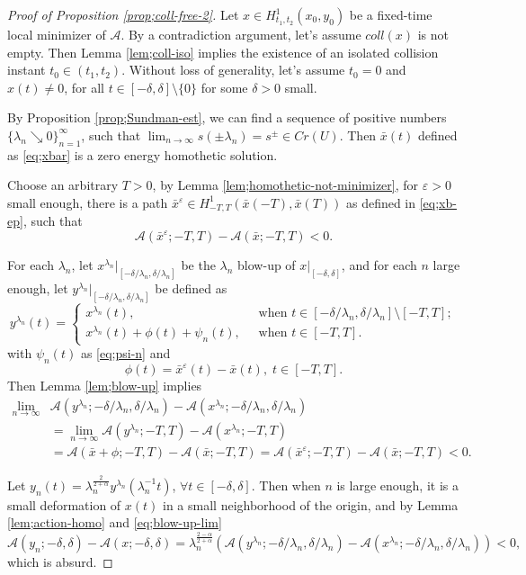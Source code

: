 \documentclass[11pt]{amsart}
\newcommand{\A}{\mathcal A}
\newcommand{\al}{\alpha}
\newcommand{\ep}{\varepsilon}
\newcommand{\dl}{\delta}
\newcommand{\lmd}{\lambda}
\newcommand{\pwa}{\frac{2}{2+\al}}
\newcommand{\xb}{\bar{x}}
\theoremstyle{plain}
\theoremstyle{definition}
\theoremstyle{remark}
\begin{document}
\begin{proof}[Proof of Proposition \ref{prop;coll-free-2}] 
Let $x \in H^1_{t_1, t_2}(x_0, y_0)$ be a fixed-time local minimizer of $\A$. By a contradiction argument, let's assume $coll(x)$ is not empty. Then Lemma \ref{lem;coll-iso} implies the existence of an isolated collision instant $t_0 \in (t_1, t_2)$. Without loss of generality, let's assume $t_0 =0$ and $x(t) \ne 0$, for all $t \in [-\dl, \dl] \setminus \{0\}$ for some $\dl>0$ small. 

By Proposition \ref{prop;Sundman-est}, we can find a sequence of positive numbers $\{\lmd_n \searrow 0\}_{n=1}^{\infty}$, such that  $\lim_{n \to \infty} s(\pm \lmd_{n}) = s^{\pm} \in Cr(U)$. Then $\xb(t)$ defined as \eqref{eq;xbar} is a zero energy homothetic solution. 

Choose an arbitrary $T>0$, by Lemma \ref{lem;homothetic-not-minimizer}, for $\ep>0$ small enough, there is a path $\xb^{\ep} \in H^1_{-T, T}(\xb(-T), \xb(T))$ as defined in \eqref{eq;xb-ep}, such that
\begin{equation*}
 \A(\xb^{\ep}; -T, T) - \A(\xb; -T, T) <0. 
\end{equation*}

For each $\lmd_n$, let $x^{\lmd_n}|_{[-\dl/\lmd_n, \dl/\lmd_n]}$ be the $\lmd_n$ blow-up of $x|_{[-\dl, \dl]}$, and for each $n$ large enough, let $y^{\lmd_n}|_{[-\dl/\lmd_n, \dl/\lmd_n]}$ be defined as
\begin{equation}
\label{eq;y-lmd} y^{\lmd_n}(t) = \begin{cases}
 x^{\lmd_n}(t), \; & \text{ when } t \in [-\dl/\lmd_n, \dl/\lmd_n] \setminus [-T, T]; \\
 x^{\lmd_n}(t) + \phi(t)+ \psi_n(t), \; & \text{ when } t \in [-T, T].
\end{cases}
\end{equation}
with $\psi_n(t)$ as \eqref{eq;psi-n} and 
$$ \phi(t) = \xb^{\ep}(t) - \xb(t), \; t \in [-T, T]. $$
Then Lemma \ref{lem;blow-up} implies 
\begin{equation}
\label{eq;blow-up-lim} \begin{aligned}
\lim_{n \to \infty} & \A(y^{\lmd_n}; -\dl/\lmd_n, \dl/\lmd_n) - \A(x^{\lmd_n};-\dl/\lmd_n,\dl/\lmd_n) \\
& = \lim_{n \to \infty} \A(y^{\lmd_n}; -T, T) - \A(x^{\lmd_n}; -T, T) \\
& = \A(\xb +\phi; -T, T) - \A(\xb; -T, T) = \A(\xb^{\ep}; -T, T) - \A(\xb; -T, T) <0.
\end{aligned}
\end{equation}

Let $y_n(t) = \lmd_n^{\pwa} y^{\lmd_n}(\lmd_n^{-1} t)$, $\forall t \in [-\dl, \dl]$. Then when $n$ is large enough, it is a small deformation of $x(t)$ in a small neighborhood of the origin, and by Lemma \ref{lem;action-homo} and \eqref{eq;blow-up-lim} 
$$ \A(y_n; -\dl, \dl) - \A(x; -\dl, \dl) = \lmd_{n}^{\frac{2-\al}{2+\al}} \left(\A(y^{\lmd_n}; -\dl/\lmd_n, \dl/\lmd_n) - \A(x^{\lmd_n};-\dl/\lmd_n, \dl/\lmd_n) \right) <0,
$$
which is absurd. 
\end{proof}
\end{document}
